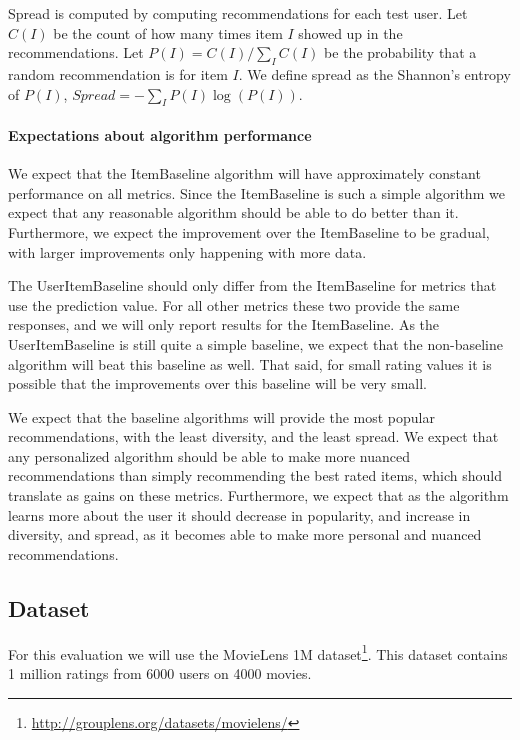 \documentclass[letterpaper]{sig-alternate}
\begin{document}
  Spread is computed by computing recommendations for each test user.
  Let $C(I)$ be the count of how many times item $I$ showed up in the recommendations.
  Let $P(I) = C(I) / \sum_I C(I)$ be the probability that a random recommendation is for item $I$.
  We define spread as the Shannon's entropy of $P(I)$, $Spread = -\sum_I P(I) \log(P(I))$.

  \paragraph{Expectations about algorithm performance}
  We expect that the ItemBaseline algorithm will have approximately constant performance on all metrics.
  Since the ItemBaseline is such a simple algorithm we expect that any reasonable algorithm should be able to do better than it.
  Furthermore, we expect the improvement over the ItemBaseline to be gradual, with larger improvements only happening with more data.

  The UserItemBaseline should only differ from the ItemBaseline for metrics that use the prediction value.
  For all other metrics these two provide the same responses, and we will only report results for the ItemBaseline.
  As the UserItemBaseline is still quite a simple baseline, we expect that the non-baseline algorithm will beat this baseline as well.
  That said, for small rating values it is possible that the improvements over this baseline will be very small.
  
  We expect that the baseline algorithms will provide the most popular recommendations, with the least diversity, and the least spread.
  We expect that any personalized algorithm should be able to make more nuanced recommendations than simply recommending the best rated items, which should translate as gains on these metrics.
  Furthermore, we expect that as the algorithm learns more about the user it should decrease in popularity, and increase in diversity, and spread, as it becomes able to make more personal and nuanced recommendations.


  \subsection*{Dataset}

  For this evaluation we will use the MovieLens 1M dataset\footnote{\url{http://grouplens.org/datasets/movielens/}}.
  This dataset contains 1 million ratings from 6000 users on 4000 movies.
  
\end{document}
